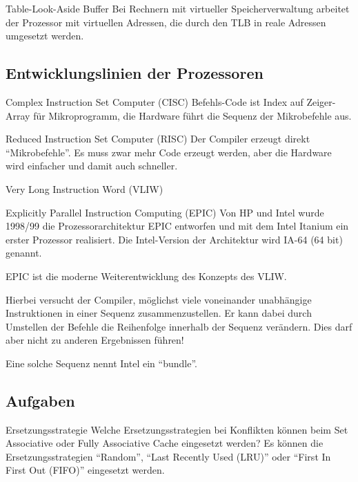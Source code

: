 \begin{defi}{Table-Look-Aside Buffer}
  Bei Rechnern mit virtueller Speicherverwaltung arbeitet der Prozessor mit virtuellen Adressen,
  die durch den TLB in reale Adressen umgesetzt werden.
\end{defi}

\subsection{Entwicklungslinien der Prozessoren}\label{subsec:entwicklungslinien-der-prozessoren}

\begin{defi}{Complex Instruction Set Computer (CISC)}
  Befehls-Code ist Index auf Zeiger-Array für Mikroprogramm,
  die Hardware führt die Sequenz der Mikrobefehle aus.
\end{defi}

\begin{defi}{Reduced Instruction Set Computer (RISC)}
  Der Compiler erzeugt direkt \enquote{Mikrobefehle}.
  Es muss zwar mehr Code erzeugt werden,
  aber die Hardware wird einfacher und damit auch schneller.
\end{defi}

\begin{defi}{Very Long Instruction Word (VLIW)}
\end{defi}

\begin{defi}{Explicitly Parallel Instruction Computing (EPIC)}
  Von HP und Intel wurde 1998/99 die Prozessorarchitektur EPIC entworfen
  und mit dem Intel Itanium ein erster Prozessor realisiert.
  Die Intel-Version der Architektur wird IA-64 (64 bit) genannt.

  EPIC ist die moderne Weiterentwicklung des Konzepts des VLIW.

  Hierbei versucht der Compiler,
  möglichst viele voneinander unabhängige Instruktionen in einer Sequenz zusammenzustellen.
  Er kann dabei durch Umstellen der Befehle die Reihenfolge innerhalb der Sequenz verändern.
  Dies darf aber nicht zu anderen Ergebnissen führen!

  Eine solche Sequenz nennt Intel ein \enquote{bundle}.
\end{defi}

\subsection{Aufgaben}

\begin{aufgabe}[Caches]{Ersetzungsstrategie}
  Welche Ersetzungsstrategien bei Konflikten können beim Set Associative oder Fully Associative Cache eingesetzt werden?
  \tcblower
  Es können die Ersetzungsstrategien \enquote{Random},
  \enquote{Last Recently Used (LRU)} oder \enquote{First In First Out (FIFO)} eingesetzt werden.
\end{aufgabe}

